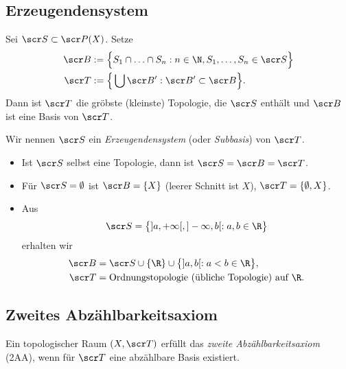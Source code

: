 \subsection{Erzeugendensystem}

\begin{st}[Erzeugendensystem]
	Sei $\scr S \subset \scr P(X)$.
	Setze
	\begin{align*}
		\scr B &:= \Big\{ S_1 \cap \dotsc \cap S_n : n \in \N, S_1, \dotsc, S_n \in \scr S \Big\} \\
		\scr T &:= \Big\{ \bigcup \scr B' : \scr B' \subset \scr B \Big\}.
	\end{align*}
	Dann ist $\scr T$ die gröbste (kleinste) Topologie, die $\scr S$ enthält und $\scr B$ ist eine Basis von $\scr T$.

	Wir nennen $\scr S$ ein \emph{Erzeugendensystem} (oder \emph{Subbasis}) von $\scr T$.
\end{st}

\begin{ex}
	\begin{itemize}
		\item
			Ist $\scr S$ selbst eine Topologie, dann ist $\scr S = \scr B = \scr T$.
		\item
			Für $\scr S = \emptyset$ ist $\scr B = \{X\}$ (leerer Schnitt ist $X$), $\scr T = \{\emptyset, X \}$.
		\item
			Aus
			\[
				\scr S = \big\{ ]a,+\infty[, ]-\infty, b[ : a,b \in \R \big\}
			\]
			erhalten wir
			\begin{align*}
				\scr B &= \scr S \cup \{\R \}  \cup \big\{ ]a,b[ : a < b \in \R \big\}, \\
				\scr T &= \text{Ordnungstopologie (übliche Topologie) auf $\R$}.
			\end{align*}
	\end{itemize}
\end{ex}

\subsection{Zweites Abzählbarkeitsaxiom}

\begin{df} \label{df:second_axiom_of_countability}
	Ein topologischer Raum $(X, \scr T)$ erfüllt das \emph{zweite Abzählbarkeitsaxiom} (2AA), wenn für $\scr T$ eine abzählbare Basis existiert.
\end{df}

